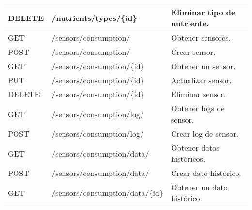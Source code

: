 \begin{table}[H]
\begin{tabular}{l l l}
        DELETE          & /nutrients/types/\{id\}          & Eliminar tipo de nutriente.   \\
        \midrule
        GET             & /sensors/consumption/            & Obtener sensores.             \\
        POST            & /sensors/consumption/            & Crear sensor.                 \\
        GET             & /sensors/consumption/\{id\}      & Obtener un sensor.            \\
        PUT             & /sensors/consumption/\{id\}      & Actualizar sensor.            \\
        DELETE          & /sensors/consumption/\{id\}      & Eliminar sensor.              \\
        \midrule
        GET             & /sensors/consumption/log/        & Obtener logs de sensor.       \\
        POST            & /sensors/consumption/log/        & Crear log de sensor.          \\
        \midrule
        GET             & /sensors/consumption/data/       & Obtener datos históricos.     \\
        POST            & /sensors/consumption/data/       & Crear dato histórico.         \\
        GET             & /sensors/consumption/data/\{id\} & Obtener un dato histórico.    \\
        \bottomrule
        \hline
    \end{tabular}
    \label{tab:endpoints2}
\end{table}

